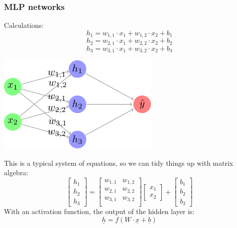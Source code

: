 \documentclass{beamer}
\begin{document}
\begin{frame}
    \frametitle{MLP networks}
    \begin{minipage}{0.45\textwidth}
        Calculations:
        \[h_{1} = w_{1, 1} \cdot x_1 + w_{1, 2} \cdot x_2 + b_{1}\]
        \[h_{2} = w_{2, 1} \cdot x_1 + w_{2, 2} \cdot x_2 + b_{2}\]
        \[h_{3} = w_{3, 1} \cdot x_1 + w_{3, 2} \cdot x_2 + b_{3}\]
    \end{minipage}
    \hfill
    \begin{minipage}{0.45\textwidth}
        \includegraphics{figures/basic-mlp-weights/main.pdf}
    \end{minipage} \pause
    \vspace{0.5cm}

    This is a typical system of equations, so we can tidy things up with matrix algebra: \pause
    \[
        \begin{bmatrix}
            h_{1} \\
            h_{2} \\
            h_{3}
        \end{bmatrix}
        =
        \begin{bmatrix}
            w_{1, 1} & w_{1, 2} \\
            w_{2, 1} & w_{2, 2} \\
            w_{3, 1} & w_{3, 2} \\
        \end{bmatrix}
        \begin{bmatrix}
            x_1 \\
            x_2
        \end{bmatrix}
        +
        \begin{bmatrix}
            b_1 \\
            b_2 \\
            b_3
        \end{bmatrix}
    \] \pause
    With an activation function, the output of the hidden layer is:
    \[\underline{h} = f(W \cdot \underline{x} + \underline{b})\]
\end{frame}
\end{document}
